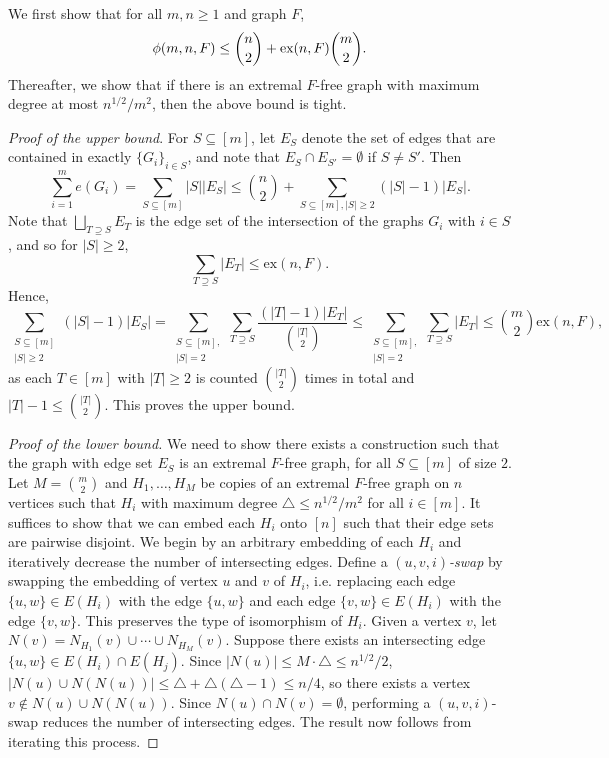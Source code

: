 \documentclass[12pt]{article}
\newcommand*{\ex}{\textnormal{ex}}
\begin{document}
We first show that for all 
$m,n \geq 1$ and graph $F$, 
\[  
  \phi(m, n ,F) \leq \binom{n}{2} + \ex(n, F)\binom{m}{2}.  
\]
Thereafter, we show that if there is an extremal $F$-free graph with maximum degree at most $n^{1/2}/m^2$, then the above bound is tight. 

\textit{Proof of the upper bound}. For $S \subseteq [m]$, let $E_S$ denote the set of edges that are contained in exactly $\{G_i\}_{i \in S}$, and note that $E_S \cap E_{S'} = \emptyset$ if $S \neq S'$. Then 
\[
  \sum_{i = 1}^m e(G_i) = \sum_{S \subseteq [m]} |S||E_S| \leq \binom{n}{2} + \sum_{S \subseteq [m], |S| \geq 2} (|S| - 1)|E_S|.
\]
Note that $\bigsqcup_{T \supseteq S} E_T$ is the edge set of the intersection of the graphs $G_i$ with $i \in S$, and so for $|S| \geq 2$, 
\[
  \sum_{T \supseteq S} |E_T| \leq \text{ex}(n, F).
\]
Hence,
\[
  \sum_{\substack{S \subseteq [m] \\ |S| \geq 2}} (|S| - 1)|E_S| = \sum_{\substack{S \subseteq [m], \\ |S| = 2}} \sum_{T \supseteq S} \frac{(|T| - 1)|E_T|}{\binom{|T|}{2}} \leq \sum_{\substack{S \subseteq [m], \\ |S| = 2}} \sum_{T \supseteq S} |E_T| \leq \binom{m}{2}\text{ex}(n, F),
\]
as each $T \in [m]$ with $|T| \geq 2$ is counted $\binom{|T|}{2}$ times in total and $|T| - 1 \leq \binom{|T|}{2}$. This proves the upper bound.

\begin{proof}[Proof of the lower bound]
  We need to show there exists a construction such that the graph with edge set $E_S$ is an extremal $F$-free graph, for all $S \subseteq [m]$ of size $2$. Let $M = \binom{m}{2}$ and $H_1, \ldots, H_M$ be copies of an extremal $F$-free graph on $n$ vertices such that $H_i$ with maximum degree $\triangle \leq n^{1/2}/m^2$ for all $i \in [m]$. It suffices to show that we can embed each $H_i$ onto $[n]$ such that their edge sets are pairwise disjoint. We begin by an arbitrary embedding of each $H_i$ and iteratively decrease the number of intersecting edges. Define a \textit{$(u, v, i)$-swap} by swapping the embedding of vertex $u$ and $v$ of $H_i$, i.e. replacing each edge $\{u, w\} \in E(H_i)$ with the edge $\{u, w\}$ and each edge $\{v, w\} \in E(H_i)$ with the edge $\{v, w\}$. This preserves the type of isomorphism of $H_i$. Given a vertex $v$, let $N(v) = N_{H_1}(v) \cup \cdots \cup N_{H_M}(v)$. Suppose there exists an intersecting edge $\{u, w\} \in E(H_i) \cap E(H_j)$. Since $|N(u)| \leq M \cdot \triangle \leq n^{1/2}/2$, $|N(u) \cup N(N(u))| \leq \triangle + \triangle(\triangle - 1) \leq n/4$, so there exists a vertex $v \notin N(u) \cup N(N(u))$. Since $N(u) \cap N(v) = \emptyset$, performing a $(u, v, i)$-swap reduces the number of intersecting edges. The result now follows from iterating this process.
\end{proof}
\end{document}
